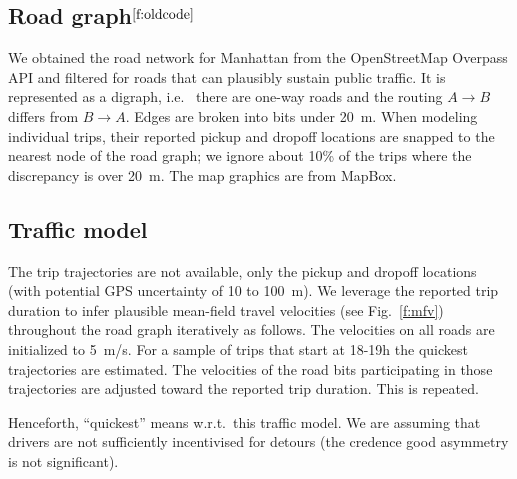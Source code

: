 \documentclass[12pt,notitlepage]{article}
\begin{document}
\subsection{Road graph${}^{\ref{f:oldcode}}$} 
\label{s:graph}



We obtained the road network for Manhattan
%
from the OpenStreetMap Overpass API
and filtered for roads that can plausibly sustain public traffic.
%
%
It is represented as a digraph,
i.e.~%
there are one-way roads 
and
the routing $A \to B$ differs from $B \to A$.
%
Edges are broken into bits under \SI{20}{m}.
%
%
When modeling individual trips,
their reported pickup and dropoff locations
are snapped to the nearest node of the road graph;
we ignore about 10\% of the trips 
where the discrepancy is over \SI{20}{m}.
%
%
%
%
The map graphics are from MapBox.



\subsection{Traffic model} \label{s:traffic}

The trip trajectories are not available,
only the pickup and dropoff locations
(with potential GPS uncertainty of 10 to \SI{100}{m}).
%
%
We leverage the reported trip duration to
infer plausible mean-field travel velocities 
(see Fig.~\ref{f:mfv})
throughout the road graph
iteratively as follows.
%
The velocities on all roads are initialized to \SI{5}{m/s}.
%
For a sample of trips that start at 18-19h
the quickest trajectories are estimated.
%
The velocities of the road bits participating in those trajectories
are adjusted toward the reported trip duration.
%
This is repeated.
%
%
%
%

Henceforth, ``quickest''
means
w.r.t.~this traffic model.
%
%
We are assuming that drivers
are not sufficiently incentivised for detours
(the credence good asymmetry is not significant).
\end{document}

